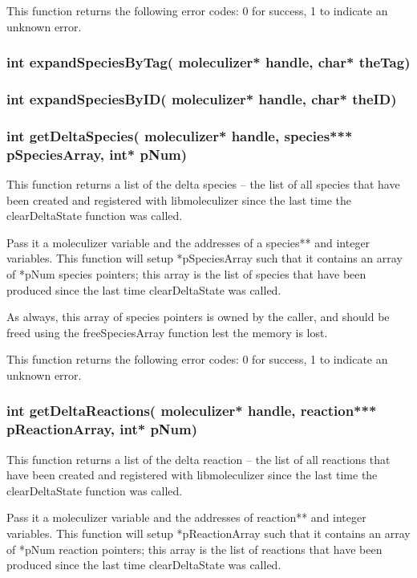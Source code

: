 This function returns the following error codes: 0 for success, 1 to
indicate an unknown error.


\subsubsection{int expandSpeciesByTag( moleculizer* handle, char*
  theTag)}


\subsubsection{int expandSpeciesByID( moleculizer* handle, char*
  theID)}

\subsubsection{int getDeltaSpecies( moleculizer* handle, species***
  pSpeciesArray, int* pNum)}
This function returns a list of the delta species -- the list of all
species that have been created and registered with libmoleculizer
since the last time the clearDeltaState function was called.  

Pass it a moleculizer variable and the addresses of a species** and
integer variables.  This function will setup *pSpeciesArray such that
it contains an array of *pNum species pointers; this array is the list
of species that have been produced since the last time clearDeltaState
was called.

As always, this array of species pointers is owned by the caller, and
should be freed using the freeSpeciesArray function lest the memory is
lost.

This function returns the following error codes: 0 for success, 1 to
indicate an unknown error.

\subsubsection{int getDeltaReactions( moleculizer* handle, reaction***
  pReactionArray, int* pNum)}
This function returns a list of the delta reaction -- the list of all
reactions that have been created and registered with libmoleculizer
since the last time the clearDeltaState function was called.

Pass it a moleculizer variable and the addresses of reaction** and
integer variables.  This function will setup *pReactionArray such that
it contains an array of *pNum reaction pointers; this array is the list
of reactions that have been produced since the last time clearDeltaState
was called.


